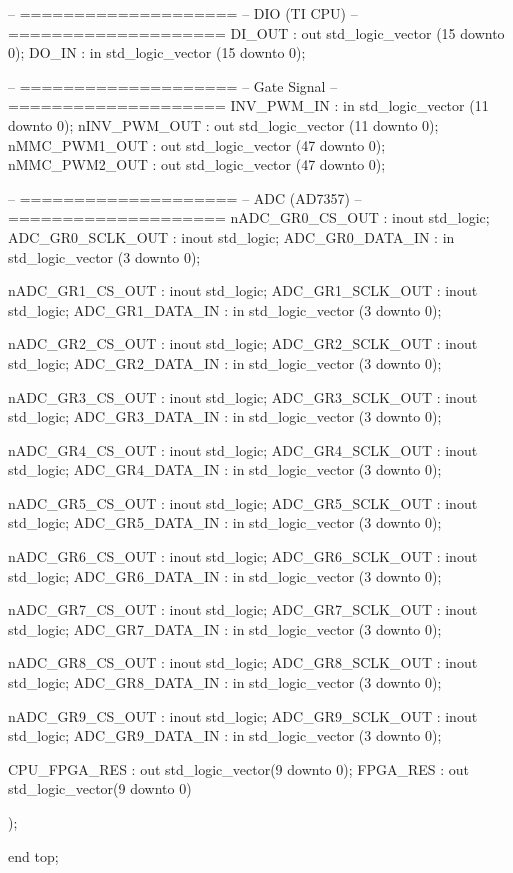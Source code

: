 \begin{mylisting}[language=VHDL,caption=トップモジュール,label=appF_Top_module_VHDL]
		-- ====================
		-- DIO	(TI CPU)
		-- ====================
		DI_OUT					: out std_logic_vector (15 downto 0);
		DO_IN					: in  std_logic_vector (15 downto 0);

		-- ====================
		-- Gate Signal
		-- ====================
		INV_PWM_IN				: in  std_logic_vector (11 downto 0);
		nINV_PWM_OUT			: out  std_logic_vector (11 downto 0);
		nMMC_PWM1_OUT			: out  std_logic_vector (47 downto 0);
		nMMC_PWM2_OUT			: out  std_logic_vector (47 downto 0);

		-- ====================
		-- ADC (AD7357)
		-- ====================
		nADC_GR0_CS_OUT			: inout  std_logic;
		ADC_GR0_SCLK_OUT		: inout  std_logic;
		ADC_GR0_DATA_IN			: in  std_logic_vector (3 downto 0);

		nADC_GR1_CS_OUT			: inout  std_logic;
		ADC_GR1_SCLK_OUT		: inout  std_logic;
		ADC_GR1_DATA_IN			: in  std_logic_vector (3 downto 0);

		nADC_GR2_CS_OUT			: inout  std_logic;
		ADC_GR2_SCLK_OUT		: inout  std_logic;
		ADC_GR2_DATA_IN			: in  std_logic_vector (3 downto 0);

		nADC_GR3_CS_OUT			: inout  std_logic;
		ADC_GR3_SCLK_OUT		: inout  std_logic;
		ADC_GR3_DATA_IN			: in  std_logic_vector (3 downto 0);

		nADC_GR4_CS_OUT			: inout  std_logic;
		ADC_GR4_SCLK_OUT		: inout  std_logic;
		ADC_GR4_DATA_IN			: in  std_logic_vector (3 downto 0);

		nADC_GR5_CS_OUT			: inout  std_logic;
		ADC_GR5_SCLK_OUT		: inout  std_logic;
		ADC_GR5_DATA_IN			: in  std_logic_vector (3 downto 0);

		nADC_GR6_CS_OUT			: inout  std_logic;
		ADC_GR6_SCLK_OUT		: inout  std_logic;
		ADC_GR6_DATA_IN			: in  std_logic_vector (3 downto 0);

		nADC_GR7_CS_OUT			: inout  std_logic;
		ADC_GR7_SCLK_OUT		: inout  std_logic;
		ADC_GR7_DATA_IN			: in  std_logic_vector (3 downto 0);

		nADC_GR8_CS_OUT			: inout  std_logic;
		ADC_GR8_SCLK_OUT		: inout  std_logic;
		ADC_GR8_DATA_IN			: in  std_logic_vector (3 downto 0);

		nADC_GR9_CS_OUT			: inout  std_logic;
		ADC_GR9_SCLK_OUT		: inout  std_logic;
		ADC_GR9_DATA_IN			: in  std_logic_vector (3 downto 0);

		CPU_FPGA_RES			: out  std_logic_vector(9 downto 0);
		FPGA_RES				: out  std_logic_vector(9 downto 0)
		
	 
	);
	

end top;


\end{mylisting}
